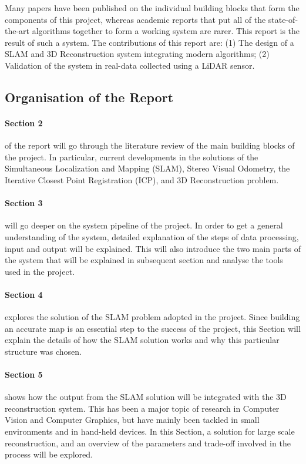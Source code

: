 \documentclass[11pt]{article}
\begin{document}
Many papers have been published on the individual building blocks that form the components of this project, whereas academic reports that put all of the state-of-the-art algorithms together to form a working system are rarer. This report is the result of such a system. The contributions of this report are: (1) The design of a SLAM and 3D Reconstruction system integrating modern algorithms; (2) Validation of the system in real-data collected using a LiDAR sensor.
	
	\subsection{ Organisation of the Report}

\paragraph{Section 2} of the report will go through the literature review of the main building blocks of the project. In particular, current developments in the solutions of the Simultaneous Localization and Mapping (SLAM), Stereo Visual Odometry, the Iterative Closest Point Registration (ICP), and 3D Reconstruction problem.
	
\paragraph{Section 3} will go deeper on the system pipeline of the project. In order to get a general understanding of the system, detailed explanation of the steps of data processing, input and output will be explained. This will also introduce the two main parts of the system that will be explained in subsequent section and analyse the tools used in the project.
		
\paragraph{Section 4} explores the solution of the SLAM problem adopted in the project. Since building an accurate map is an essential step to the success of the project, this Section will explain the details of how the SLAM solution works and why this particular structure was chosen.
		
\paragraph{Section 5} shows how the output from the SLAM solution will be integrated with the 3D reconstruction system. This has been a major topic of research in Computer Vision and Computer Graphics, but have mainly been tackled in small environments and in hand-held devices. In this Section, a solution for large scale reconstruction, and an overview of the parameters and trade-off involved in the process will be explored.
		
\end{document}
